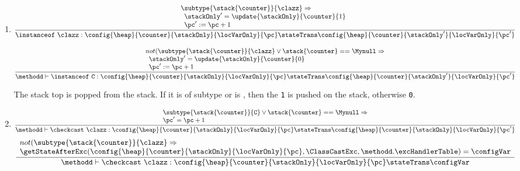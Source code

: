 \begin{itemize}
\begin{enumerate}
	\item \instanceof
	      $$ \frac{ \begin{array}{l}
                            \subtype{\stack{\counter}}{\clazz} \Rightarrow \\	
		            \begin{array}{l}    
			          \stackOnly' = \update{\stackOnly}{\counter}{1}   \\
                 		  \pc' :=  \pc +1 
		            \end{array}
			\end{array} 
	              }
                      {\instanceof  \ \clazz : \config{\heap}{\counter}{\stackOnly}{\locVarOnly}{\pc} 
		                                   \stateTrans  
						   \config{\heap}{\counter}{\stackOnly'}{\locVarOnly}{\pc'}}  $$
              
	      $$
		\frac{ \begin{array}{l}
                             not( \subtype{\stack{\counter}}{\clazz} \vee \stack{\counter} == \Mynull  \Rightarrow  \\
			         \begin{array}{l}
			                \stackOnly' = \update{\stackOnly}{\counter}{0}   \\
					\pc' :=  \pc +1 
			     \end{array}
		        \end{array} }
		     {\methodd \vdash \instanceof  \ \tt{C} : \config{\heap}{\counter}{\stackOnly}{\locVarOnly}{\pc} 
		                                   \stateTrans  
						   \config{\heap}{\counter}{\stackOnly'}{\locVarOnly}{\pc'}}  $$
		
	      
	      The stack top is popped from the stack. If it is of subtype \clazz or
	      is \Mynull, then the   \texttt{1} is pushed on the stack, otherwise \texttt{0}. 
         
       	\item \checkcast
          $$ \frac{\begin{array}{l}
		               \subtype{\stack{\counter}}{\texttt{C}}  \vee \stack{\counter} == \Mynull  \Rightarrow \\
			      \pc' =  \pc  +1 
		 \end{array}}
		  {\methodd \vdash \checkcast \ \clazz :     \config{\heap}{\counter}{\stackOnly}{\locVarOnly}{\pc} 
		                             \stateTrans  
					     \config{\heap}{\counter}{\stackOnly}{\locVarOnly}{\pc'}} 
	  $$	      
	  $$\frac{\begin{array}{l}	
			       not(\subtype{\stack{\counter}}{\clazz} \Rightarrow \\
			       \getStateAfterExc( \config{\heap}{\counter}{\stackOnly}{\locVarOnly}{\pc}, \ClassCastExc,\methodd.\excHandlerTable ) =  \configVar                                \end{array}}
		  {\methodd \vdash \checkcast \ \clazz :     \config{\heap}{\counter}{\stackOnly}{\locVarOnly}{\pc} 
		                             \stateTrans  
					     \configVar} 
	  $$




\end{enumerate}
\end{itemize}

